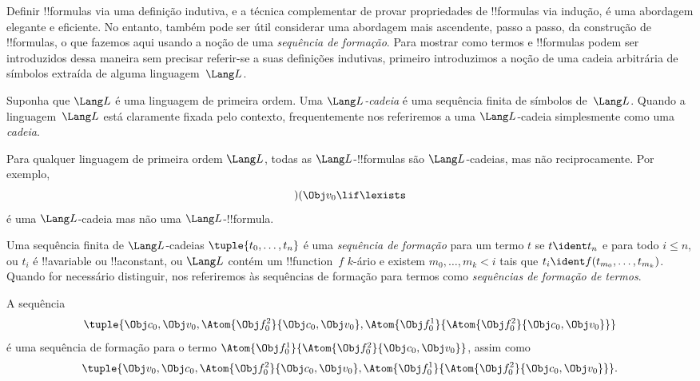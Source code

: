 \documentclass[../../../include/open-logic-section]{subfiles}
\begin{document}


Definir !!{formula}s via uma definição indutiva, e a
técnica complementar de provar propriedades de !!{formula}s via
indução, é uma abordagem elegante e eficiente. No entanto, também pode
ser útil considerar uma abordagem mais ascendente, passo a passo,
da construção de !!{formula}s, o que fazemos aqui usando a
noção de uma \emph{sequência de formação}.
%
Para mostrar como termos e !!{formula}s podem ser introduzidos dessa maneira
sem precisar referir-se a suas definições indutivas, primeiro
introduzimos a noção de uma cadeia arbitrária de símbolos extraída de
alguma linguagem~$\Lang L$.

\begin{defn}[Cadeias]
Suponha que $\Lang L$ é uma linguagem de primeira ordem. Uma \emph{$\Lang
L$-cadeia} é uma sequência finita de símbolos de~$\Lang L$. Quando a
linguagem~$\Lang L$ está claramente fixada pelo contexto, frequentemente nos
referiremos a uma $\Lang L$-cadeia simplesmente como uma \emph{cadeia}.
\end{defn}

\begin{ex}
Para qualquer linguagem de primeira ordem $\Lang L$, todas as
$\Lang L$-!!{formula}s são $\Lang L$-cadeias, mas não
reciprocamente. Por exemplo, \[)(\Obj v_0\lif\lexists\] é uma
$\Lang L$-cadeia mas não uma $\Lang L$-!!{formula}.
\end{ex}

\begin{defn}
Uma sequência finita de $\Lang L$-cadeias $\tuple{t_0,\dotsc,t_n}$ é uma
\emph{sequência de formação} para um termo $t$ se $t \ident t_n$ e para todo
$i \leq n$, ou $t_i$ é !!a{variable} ou !!a{constant}, ou $\Lang
L$ contém um !!{function}~$f$ $k$-ário e existem
$m_0,\dotsc,m_k < i$ tais que $t_i \ident f(t_{m_0},\dotsc,t_{m_k})$.
Quando for necessário distinguir, nos referiremos às sequências de formação
para termos como \emph{sequências de formação de termos}.
\end{defn}

\begin{ex}
A sequência
\[
    \tuple{\Obj c_0, \Obj v_0, \Atom{\Obj f^2_0}{\Obj c_0, \Obj v_0}, \Atom{\Obj f^1_0}{\Atom{\Obj f^2_0}{\Obj c_0, \Obj v_0}}}
\]
é uma sequência de formação para o termo $\Atom{\Obj f^1_0}{\Atom{\Obj
f^2_0}{\Obj c_0, \Obj v_0}}$, assim como
\[
    \tuple{\Obj v_0, \Obj c_0, \Atom{\Obj f^2_0}{\Obj c_0, \Obj v_0}, \Atom{\Obj f^1_0}{\Atom{\Obj f^2_0}{\Obj c_0, \Obj v_0}}}.
\]
\end{ex}
\end{document}
